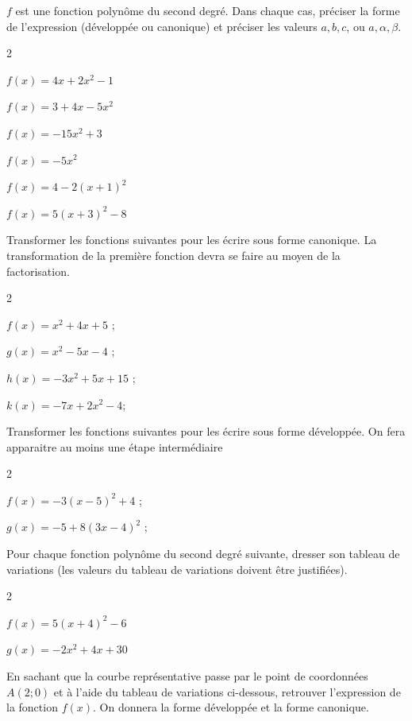 \documentclass[11pt,a4paper]{article}  %
\begin{document}
$f$ est une fonction polynôme du second degré. Dans chaque cas, préciser la forme de l'expression (développée ou canonique) et préciser les valeurs $a, b, c$, ou $a, \alpha, \beta$.
\begin{multicols}{2}
	\begin{enumMet}
		\item $f(x)=4 x+2 x^2-1$
		\item $f(x)=3+4x-5x^2$
		\item $f(x)=-15 x^2+3$
		\item $f(x)=-5 x^2$
		\item $f(x)=4-2(x+1)^2$
		\item $f(x)=5(x+3)^2-8$
	\end{enumMet}
\end{multicols}
\vspace*{-0.3cm}
Transformer les fonctions suivantes pour les écrire sous forme canonique. La transformation de la première fonction devra se faire au moyen de la factorisation.
\begin{multicols}{2}
    \begin{enumMet}
        \item $f(x)=x^2+4x+5$ ;
        \item  $g(x)=x^2-5x-4$ ;
        \item $h(x)=-3x^2+5x+15$ ;
        \item $k(x)=-7x+2x^2-4$;
    \end{enumMet}
\end{multicols}
\vspace*{-0.3cm}
Transformer les fonctions suivantes pour les écrire sous forme développée. On fera apparaitre au moins une étape intermédiaire
\begin{multicols}{2}
	\begin{enumMet}
		\item $f(x)=-3(x-5)^2+4$ ;
		\item $g(x)=-5+8(3x-4)^2$ ;
	\end{enumMet}
\end{multicols}
\vspace*{-0.3cm}
Pour chaque fonction polynôme du second degré suivante, dresser son tableau de variations (les valeurs du tableau de variations doivent être justifiées).
\begin{multicols}{2}
	\begin{enumMet}
	     \item $f(x)=5(x+4)^2-6$
	     \item $g(x)=-2x^2+4x+30$
	\end{enumMet}
\end{multicols}
\vspace*{-0.3cm}
\newpage
{}
En sachant que la courbe représentative passe par le point de coordonnées $A(2;0)$ et à l'aide du tableau de variations ci-dessous, retrouver l'expression de la fonction $f(x)$. On donnera la forme développée et la forme canonique.
\end{document}
